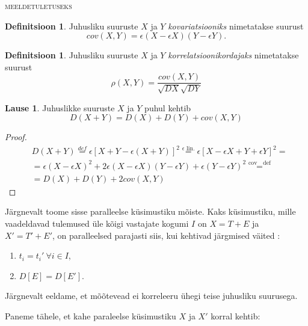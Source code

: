 \documentclass[a4paper,12pt]{article}
\newenvironment{meeldetuletus}{
	\begin{lrbox}{\thisOne}
		\begin{minipage}{0.95\textwidth} \vspace{0.25em} {\scriptsize \textsc{meeldetuletuseks}} \linebreak \vspace{-2em}
} 
{  
 \end{minipage}\end{lrbox}{
 		
 			\begin{mdframed}[tikzsetting={draw=black,dashed,line width=0.5pt, dash pattern = on 10pt off 3pt},%
 			linecolor=background_example,backgroundcolor=background_example,outerlinewidth=1pt]
 			\usebox{\thisOne}
 			\end{mdframed}
 		
 		
 	}
}
\numberwithin{equation}{section}
\theoremstyle{definition}
\newtheorem*{kovariatsioon}{Definitsioon}
\newtheorem*{korrelatsioon}{Definitsioon}
\newtheorem{summa_dispersioon}[equation]{Lause}
\begin{document}
\begin{meeldetuletus}
\begin{kovariatsioon}
Juhusliku suuruste $X$ ja $Y$ \textit{kovariatsiooniks} nimetatakse suurust
\begin{equation*}
cov(X,Y) = \epsilon \left( X - \epsilon X \right)\left(Y - \epsilon Y \right) \text{.}
\end{equation*}
\end{kovariatsioon}
\begin{korrelatsioon}
Juhusliku suuruste $X$ ja $Y$ \textit{korrelatsioonikordajaks} nimetatakse suurust 
\begin{equation*}
\rho (X,Y) = \frac{cov(X,Y)}{\sqrt{DX}\sqrt{DY}} 
\end{equation*}
\end{korrelatsioon}
\begin{summa_dispersioon}
Juhuslikke suuruste $X$ ja $Y$ puhul kehtib 
\begin{equation*}
D(X + Y) = D(X) + D(Y) + cov(X,Y)
\end{equation*} 
\begin{proof}
\begin{align*}
&D(X + Y) \overset{def}{=}\epsilon[X + Y - \epsilon(X + Y)]^2\overset{\text{$\epsilon$ lin.} }{=}  \epsilon [X - \epsilon X + Y + \epsilon Y]^2 = \\
& = \epsilon(X - \epsilon X)^2 + 2\epsilon (X - \epsilon X)(Y - \epsilon Y) + \epsilon (Y - \epsilon Y)^2   
 \overset{\text{cov ~ def}}{=}  \\  & = D(X) + D(Y) + 2cov(X,Y)
\end{align*}
\end{proof}
\end{summa_dispersioon}
\end{meeldetuletus}

Järgnevalt toome sisse paralleelse küsimustiku mõiste. Kaks küsimustiku, mille vaadeldavad tulemused üle kõigi vastajate kogumi $I$ on $X = T + E$ ja $X' = T' + E'$,  on paralleelsed parajasti siis, kui kehtivad järgmised väited :
\begin{enumerate}
\item $t_i = t_i' ~ \forall i \in I $,
\item $D \left[ E \right] = D \left[ E' \right]$. 
\end{enumerate}

{\color{blue} Järgnevalt eeldame, et mõõtevead ei korreleeru ühegi teise juhusliku suurusega.}

Paneme tähele, et kahe paraleelse küsimustiku $X$ ja $X'$ korral kehtib:
\end{document}
